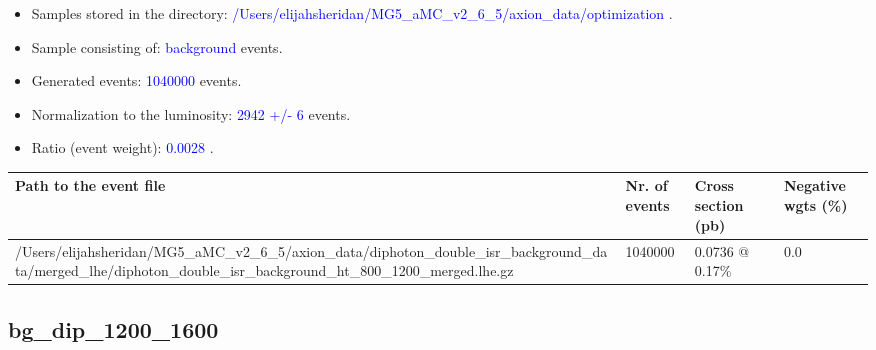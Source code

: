 \documentclass[a4paper, 10pt]{article}
\begin{document}
\begin{itemize}
  \item Samples stored in the directory: \textcolor{blue}{/\-Users/\-elijahsheridan/\-MG5\_aMC\_v2\_6\_5/\-axion\_data/\-optimization} .
   \item Sample consisting of: \textcolor{blue}{background}  events.
   \item Generated events: \textcolor{blue}{1040000 }  events.
   \item Normalization to the luminosity: \textcolor{blue}{2942}\textcolor{blue}{ +/\-- }\textcolor{blue}{6 }  events.
   \item Ratio (event weight): \textcolor{blue}{0.0028 } .  
 
\end{itemize}
\begin{table}[H]
  \begin{center}
    \begin{tabular}{|m{55.0mm}|m{25.0mm}|m{30.0mm}|m{30.0mm}|}
      \hline
      {\cellcolor{yellow}         Path to the event file}& {\cellcolor{yellow}         Nr. of events}& {\cellcolor{yellow}         Cross section (pb)}& {\cellcolor{yellow}         Negative wgts (\%)}\\
      \hline
      {\cellcolor{white}          /\-Users/\-elijahsheridan/\-MG5\_aMC\_v2\_6\_5/\-axion\_data/\-diphoton\_double\_isr\_background\_data/\-merged\_lhe/\-diphoton\_double\_isr\_background\_ht\_800\_1200\_merged.lhe.gz}& {\cellcolor{white}          1040000}& {\cellcolor{white}          0.0736 @ 0.17\%}& {\cellcolor{white}          0.0}\\
\hline
    \end{tabular}
  \end{center}
\end{table}

\subsection{ bg\_dip\_1200\_1600}
\end{document}
